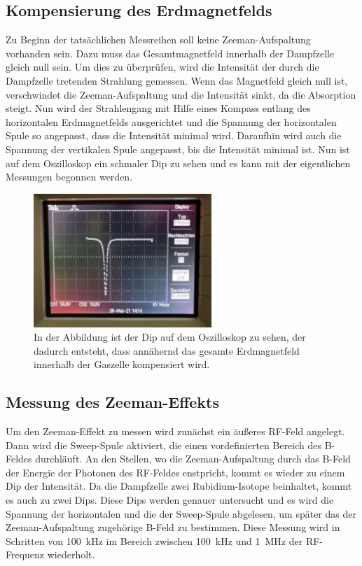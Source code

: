     \subsection{Kompensierung des Erdmagnetfelds}
        Zu Beginn der tatsächlichen Messreihen soll keine Zeeman-Aufspaltung vorhanden sein. Dazu muss das Gesamtmagnetfeld innerhalb der Dampfzelle gleich null sein. Um dies zu überprüfen, wird die Intensität
        der durch die Dampfzelle tretenden Strahlung gemessen. Wenn das Magnetfeld gleich null ist, verschwindet die Zeeman-Aufspaltung und die Intensität sinkt, da die Absorption steigt. Nun wird der 
        Strahlengang mit Hilfe eines Kompass entlang des horizontalen Erdmagnetfelds ausgerichtet und die Spannung der horizontalen Spule so angepasst, dass die Intensität minimal wird. Daraufhin wird auch die
        Spannung der vertikalen Spule angepasst, bis die Intensität minimal ist. Nun ist auf dem Oszilloskop ein schmaler Dip zu sehen und es kann mit der eigentlichen Messungen begonnen werden.  

        \FloatBarrier

        \begin{figure}[h]
          \centering
          \includegraphics[width = 0.6\textwidth]{pictures/B_0.jpg}
          \caption{In der Abbildung ist der Dip auf dem Oszilloskop zu sehen, der dadurch entsteht, dass annähernd das gesamte Erdmagnetfeld innerhalb der Gaszelle kompensiert wird.}
          \label{fig:B_0_dip}
        \end{figure}

        \FloatBarrier

        \noindent

    \subsection{Messung des Zeeman-Effekts}
        Um den Zeeman-Effekt zu messen wird zunächst ein äußeres RF-Feld angelegt. Dann wird die Sweep-Spule aktiviert, die einen vordefinierten Bereich des B-Feldes durchläuft. An den Stellen, wo die 
        Zeeman-Aufspaltung durch das B-Feld der Energie der Photonen des RF-Feldes enstpricht, kommt es wieder zu einem Dip der Intensität. Da die Dampfzelle zwei Rubidium-Isotope beinhaltet, kommt es auch zu 
        zwei Dips. Diese Dips werden genauer untersucht und es wird die Spannung der horizontalen und die der Sweep-Spule abgelesen, um später das der Zeeman-Aufspaltung zugehörige B-Feld zu bestimmen. Diese 
        Messung wird in Schritten von \SI{100}{\kilo\hertz} im Bereich zwischen \SI{100}{\kilo\hertz} und \SI{1}{\mega\hertz} der RF-Frequenz wiederholt. 

        
        
